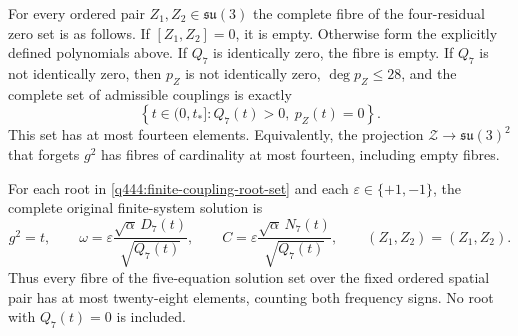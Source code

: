 \begin{theorem}
\label{q444:finite-coupling-fibre}
For every ordered pair $Z_1,Z_2\in\mathfrak{su}(3)$ the complete fibre of
the four-residual zero set is as follows.
If $[Z_1,Z_2]=0$, it is empty. Otherwise form the explicitly defined
polynomials above. If $Q_7$ is identically zero, the fibre is empty.
If $Q_7$ is not identically zero, then $p_Z$ is not identically zero,
$\deg p_Z\le28$, and the complete set of admissible couplings is exactly
\begin{equation}
 \left\{t\in(0,t_*]:Q_7(t)>0,\ p_Z(t)=0\right\}.
 \label{q444:finite-coupling-root-set}
\end{equation}
This set has at most fourteen elements. Equivalently, the projection
$\mathcal Z\longrightarrow\mathfrak{su}(3)^2$ that forgets $g^2$ has
fibres of cardinality at most fourteen, including empty fibres.

For each root in \eqref{q444:finite-coupling-root-set} and each
$\varepsilon\in\{+1,-1\}$, the complete original finite-system solution is
\begin{equation}
 g^2=t,\qquad
 \omega=\varepsilon\frac{\sqrt\alpha\,D_7(t)}{\sqrt{Q_7(t)}},\qquad
 C=\varepsilon\frac{\sqrt\alpha\,N_7(t)}{\sqrt{Q_7(t)}},\qquad
 (Z_1,Z_2)=(Z_1,Z_2).
 \label{q444:finite-coupling-reconstruction}
\end{equation}
Thus every fibre of the five-equation solution set over the fixed ordered
spatial pair has at most twenty-eight elements, counting both frequency
signs. No root with $Q_7(t)=0$ is included.
\end{theorem}
